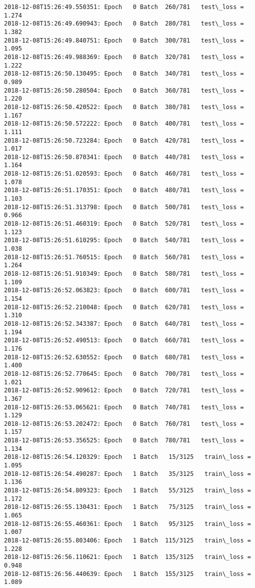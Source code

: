 \documentclass[11pt]{article}
\begin{document}
\begin{Verbatim}[commandchars=\\\{\}]
2018-12-08T15:26:49.550351: Epoch   0 Batch  260/781   test\_loss = 1.274
2018-12-08T15:26:49.690943: Epoch   0 Batch  280/781   test\_loss = 1.382
2018-12-08T15:26:49.840751: Epoch   0 Batch  300/781   test\_loss = 1.095
2018-12-08T15:26:49.988369: Epoch   0 Batch  320/781   test\_loss = 1.222
2018-12-08T15:26:50.130495: Epoch   0 Batch  340/781   test\_loss = 0.989
2018-12-08T15:26:50.280504: Epoch   0 Batch  360/781   test\_loss = 1.220
2018-12-08T15:26:50.420522: Epoch   0 Batch  380/781   test\_loss = 1.167
2018-12-08T15:26:50.572222: Epoch   0 Batch  400/781   test\_loss = 1.111
2018-12-08T15:26:50.723284: Epoch   0 Batch  420/781   test\_loss = 1.017
2018-12-08T15:26:50.870341: Epoch   0 Batch  440/781   test\_loss = 1.164
2018-12-08T15:26:51.020593: Epoch   0 Batch  460/781   test\_loss = 1.078
2018-12-08T15:26:51.170351: Epoch   0 Batch  480/781   test\_loss = 1.103
2018-12-08T15:26:51.313798: Epoch   0 Batch  500/781   test\_loss = 0.966
2018-12-08T15:26:51.460319: Epoch   0 Batch  520/781   test\_loss = 1.123
2018-12-08T15:26:51.610295: Epoch   0 Batch  540/781   test\_loss = 1.038
2018-12-08T15:26:51.760515: Epoch   0 Batch  560/781   test\_loss = 1.264
2018-12-08T15:26:51.910349: Epoch   0 Batch  580/781   test\_loss = 1.109
2018-12-08T15:26:52.063823: Epoch   0 Batch  600/781   test\_loss = 1.154
2018-12-08T15:26:52.210048: Epoch   0 Batch  620/781   test\_loss = 1.310
2018-12-08T15:26:52.343387: Epoch   0 Batch  640/781   test\_loss = 1.194
2018-12-08T15:26:52.490513: Epoch   0 Batch  660/781   test\_loss = 1.176
2018-12-08T15:26:52.630552: Epoch   0 Batch  680/781   test\_loss = 1.400
2018-12-08T15:26:52.770645: Epoch   0 Batch  700/781   test\_loss = 1.021
2018-12-08T15:26:52.909612: Epoch   0 Batch  720/781   test\_loss = 1.367
2018-12-08T15:26:53.065621: Epoch   0 Batch  740/781   test\_loss = 1.129
2018-12-08T15:26:53.202472: Epoch   0 Batch  760/781   test\_loss = 1.157
2018-12-08T15:26:53.356525: Epoch   0 Batch  780/781   test\_loss = 1.134
2018-12-08T15:26:54.120329: Epoch   1 Batch   15/3125   train\_loss = 1.095
2018-12-08T15:26:54.490287: Epoch   1 Batch   35/3125   train\_loss = 1.136
2018-12-08T15:26:54.809323: Epoch   1 Batch   55/3125   train\_loss = 1.172
2018-12-08T15:26:55.130431: Epoch   1 Batch   75/3125   train\_loss = 1.065
2018-12-08T15:26:55.460361: Epoch   1 Batch   95/3125   train\_loss = 1.007
2018-12-08T15:26:55.803406: Epoch   1 Batch  115/3125   train\_loss = 1.228
2018-12-08T15:26:56.110621: Epoch   1 Batch  135/3125   train\_loss = 0.948
2018-12-08T15:26:56.440639: Epoch   1 Batch  155/3125   train\_loss = 1.089

\end{Verbatim}
\end{document}
